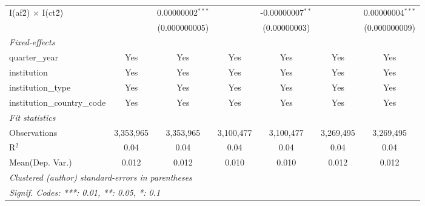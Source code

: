 \begin{tabular}{lcccccc}
   I(af\^2) $\times$ I(ct\^2)         &               & 0.00000002$^{***}$ &                & -0.00000007$^{**}$ &               & 0.00000004$^{***}$\\   
                                      &               & (0.000000005)      &                & (0.00000003)       &               & (0.000000009)\\   
   \midrule
   \emph{Fixed-effects}\\
   quarter\_year                      & Yes           & Yes                & Yes            & Yes                & Yes           & Yes\\  
   institution                        & Yes           & Yes                & Yes            & Yes                & Yes           & Yes\\  
   institution\_type                  & Yes           & Yes                & Yes            & Yes                & Yes           & Yes\\  
   institution\_country\_code         & Yes           & Yes                & Yes            & Yes                & Yes           & Yes\\  
   \midrule
   \emph{Fit statistics}\\
   Observations                       & 3,353,965     & 3,353,965          & 3,100,477      & 3,100,477          & 3,269,495     & 3,269,495\\  
   R$^2$                              & 0.04          & 0.04               & 0.04           & 0.04               & 0.04          & 0.04\\  
Mean(Dep. Var.) & 0.012 & 0.012 & 0.010 & 0.010 & 0.012 & 0.012 \\
   \midrule \midrule
   \multicolumn{7}{l}{\emph{Clustered (author) standard-errors in parentheses}}\\
   \multicolumn{7}{l}{\emph{Signif. Codes: ***: 0.01, **: 0.05, *: 0.1}}\\
\end{tabular}
\par\endgroup
